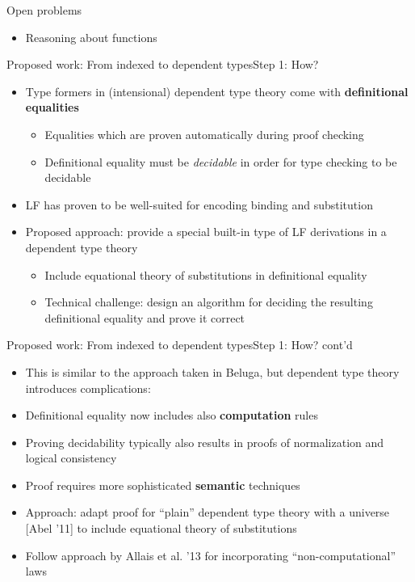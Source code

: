 \documentclass[usenames,dvipsnames]{beamer}
\begin{document}

\begin{frame}{Open problems}
\begin{itemize}
\item Reasoning about functions
\end{itemize}
\end{frame}


\begin{frame}{Proposed work: From indexed to dependent types}{Step 1: How?}
\begin{itemize}
\item Type formers in (intensional) dependent type theory come with \textbf{definitional equalities}
\begin{itemize}
\item Equalities which are proven automatically during proof checking
\item Definitional equality must be \emph{decidable} in order for type checking to be decidable
\end{itemize}
\item LF has proven to be well-suited for encoding binding and substitution
\item Proposed approach: provide a special built-in type of LF derivations in a dependent type theory
\begin{itemize}
\item Include equational theory of substitutions in definitional equality
\item Technical challenge: design an algorithm for deciding the resulting definitional equality and prove it correct
\end{itemize}
\end{itemize}
\end{frame}

\begin{frame}{Proposed work: From indexed to dependent types}{Step 1: How? cont'd}
\begin{itemize}
\item This is similar to the approach taken in Beluga, but dependent type theory introduces complications:
\item Definitional equality now includes also \textbf{computation} rules
\item Proving decidability typically also results in proofs of normalization and logical consistency
\item Proof requires more sophisticated \textbf{semantic} techniques
\item Approach: adapt proof for ``plain'' dependent type theory with a universe [Abel '11] to include equational theory of substitutions
\item Follow approach by Allais et al. '13 for incorporating ``non-computational'' laws
\end{itemize}
\end{frame}
\end{document}
